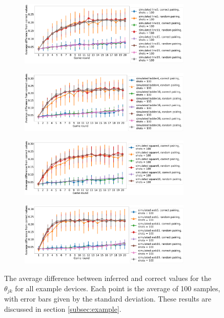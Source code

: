 \documentclass[aps,prl,twocolumn,showpacs,preprintnumbers]{revtex4-1}
\begin{document}
\begin{figure}
    \centering
    \begin{subfigure}[b]{\textwidth}
        \includegraphics[width=0.9\textwidth]{figures/line_diff.png}
    \end{subfigure}
    \begin{subfigure}[b]{\textwidth}
        \includegraphics[width=0.9\textwidth]{figures/ladder_diff.png}
    \end{subfigure}
    \begin{subfigure}[b]{\textwidth}
        \includegraphics[width=0.9\textwidth]{figures/square_diff.png}
    \end{subfigure}
    \begin{subfigure}[b]{\textwidth}
        \includegraphics[width=0.9\textwidth]{figures/web_diff.png}
    \end{subfigure}
    \caption{The average difference between inferred and correct values for the $\theta_{jk}$ for all example devices. Each point is the average of 100 samples, with error bars given by the standard deviation. These results are discussed in section \ref{subsec:example}.}\label{fig:example_diff}
\end{figure}
\pagebreak
\end{document}
